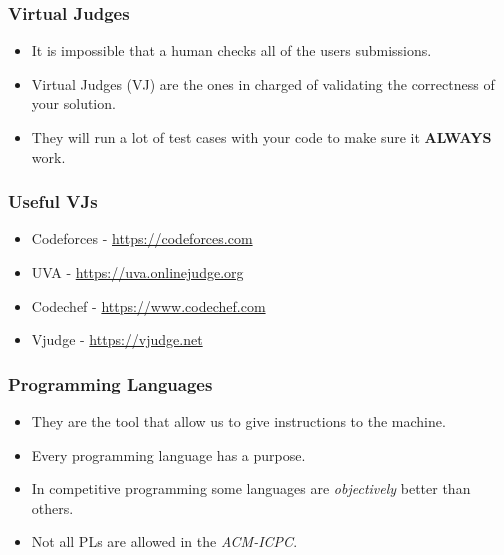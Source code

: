 \documentclass{beamer}
\begin{document}
\begin{frame}
    \frametitle{Virtual Judges}

    \begin{itemize}
        \item It is impossible that a human checks all of the users submissions.
        \item Virtual Judges (VJ) are the ones in charged of validating the correctness of your solution.
        \item They will run a lot of test cases with your code to make sure it \textbf{ALWAYS} work.
    \end{itemize}
\end{frame}

\begin{frame}
    \frametitle{Useful VJs}

    \begin{itemize}
        \item Codeforces - \url{https://codeforces.com}
        \item UVA - \url{https://uva.onlinejudge.org}
        \item Codechef - \url{https://www.codechef.com}
        \item Vjudge - \url{https://vjudge.net}
    \end{itemize}
\end{frame}

\begin{frame}
    \frametitle{Programming Languages}

    \begin{itemize}
        \item They are the tool that allow us to give instructions to the machine.
        \item Every programming language has a purpose.
        \item In competitive programming some languages are \textit{objectively} better than others.
        \item Not all PLs are allowed in the \textit{ACM-ICPC}.
    \end{itemize}
\end{frame}
\end{document}
